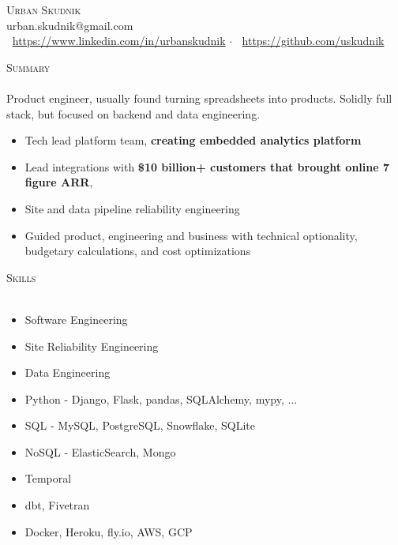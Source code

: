 \documentclass[a4paper]{article}
\newcommand{\lineunder} {
    \vspace*{-8pt} \\
    \hspace*{-18pt} {\color{Mahogany} \hrulefill} \\
}
\newcommand{\header} [1] {
    \vspace{4mm}
    {\hspace*{-18pt}\vspace*{6pt} \large \textsc{\textcolor{Mahogany}{#1}}}
    \vspace*{-6pt} \lineunder
}
\begin{document}
\vspace*{-40pt}



\vspace*{-10pt}
\begin{center}
	{\Huge \scshape {Urban Skudnik}}\\
    \vspace{2mm}
	urban.skudnik@gmail.com\\
    \vspace{2mm}
    \faLinkedinSquare  $\>$ \url{https://www.linkedin.com/in/urbanskudnik} $\cdot$
    \faGithub $\>$ \url{https://github.com/uskudnik}\\
\end{center}

\header{Summary}
Product engineer, usually found turning spreadsheets into products. Solidly full stack, but focused on backend and data engineering.

\begin{itemize} \itemsep 1pt
\item Tech lead platform team, \textbf{creating embedded analytics platform}
\item Lead integrations with \textbf{\$10 billion+ customers that brought online 7 figure ARR},
\item Site and data pipeline reliability engineering
\item Guided product, engineering and business with technical optionality, budgetary calculations, and cost optimizations
\end{itemize}


\header{Skills}
\begin{itemize} \itemsep 1pt
    \item Software Engineering
    \item Site Reliability Engineering
    \item Data Engineering
    \item Python - Django, Flask, pandas, SQLAlchemy, mypy, ...
    \item SQL - MySQL, PostgreSQL, Snowflake, SQLite
    \item NoSQL - ElasticSearch, Mongo
    \item Temporal
    \item dbt, Fivetran
    \item Docker, Heroku, fly.io, AWS, GCP
\end{itemize}

\pagebreak
\end{document}
